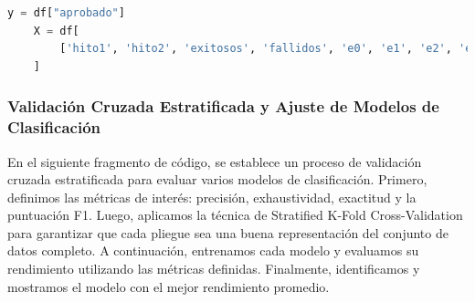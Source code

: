 \begin{lstlisting}[language=Python, caption=Selección de características y variable objetivo, label=lst:seleccion_caracteristicas]
    y = df["aprobado"]
    X = df[
        ['hito1', 'hito2', 'exitosos', 'fallidos', 'e0', 'e1', 'e2', 'e3', 'e4', 'e5', 'e6', 'e7', 'e8', 'e9', 'e10', 'e11', 'e12', 'e13', 'e14', 'e15', 'e16', 'e17', 'e18', 'e19', 'e20', 'e21', 'e22', 'e23', 'e24', 'e25', 'e26', 'e27', 'e28', 'e29', 'e30', 'e31', 'e32', 'e33', 'e34', 'e35', 'e36', 'e37', 'e38', 'e39', 'e40', 'e41', 'e42', 'e43', 'e44', 'e45', 'e46', 'e47', 'e48', 'e49', 'e50', 'e51', 'e52']
    ]
\end{lstlisting}


\subsubsection{Validación Cruzada Estratificada y Ajuste de Modelos de Clasificación}

En el siguiente fragmento de código, se establece un proceso de validación cruzada estratificada para evaluar varios modelos de clasificación. Primero, definimos las métricas de interés: precisión, exhaustividad, exactitud y la puntuación F1. Luego, aplicamos la técnica de Stratified K-Fold Cross-Validation para garantizar que cada pliegue sea una buena representación del conjunto de datos completo. A continuación, entrenamos cada modelo y evaluamos su rendimiento utilizando las métricas definidas. Finalmente, identificamos y mostramos el modelo con el mejor rendimiento promedio.


